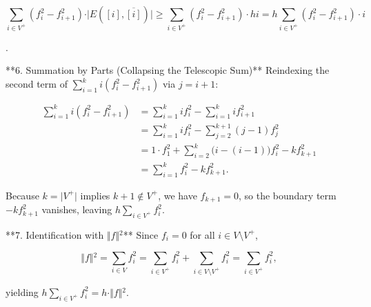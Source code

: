 \documentclass{article}
\begin{document}
$$\sum_{i \in V^+} (f_i^2 - f_{i+1}^2) \cdot \vert{}E([i], \overline{[i]})\vert{} \ge \sum_{i \in V^+} (f_i^2 - f_{i+1}^2) \cdot h i = h \sum_{i \in V^+} (f_i^2 - f_{i+1}^2) \cdot i$$

.

**6. Summation by Parts (Collapsing the Telescopic Sum)**
Reindexing the second term of $\sum_{i=1}^{k} i (f_i^2 - f_{i+1}^2)$ via $j = i + 1$:


$$\begin{aligned} \sum_{i=1}^{k} i (f_i^2 - f_{i+1}^2) &= \sum_{i=1}^{k} i f_i^2 - \sum_{i=1}^{k} i f_{i+1}^2 \\ &= \sum_{i=1}^{k} i f_i^2 - \sum_{j=2}^{k+1} (j - 1) f_j^2 \\ &= 1 \cdot f_1^2 + \sum_{i=2}^{k} \bigl(i - (i - 1)\bigr) f_i^2 - k f_{k+1}^2 \\ &= \sum_{i=1}^{k} f_i^2 - k f_{k+1}^2. \end{aligned}$$


Because $k = \vert{}V^+\vert{}$ implies $k + 1 \notin V^+$, we have $f_{k+1} = 0$, so the boundary term $-k f_{k+1}^2$ vanishes, leaving $h \sum_{i \in V^+} f_i^2$.

**7. Identification with $\Vert{}f\Vert{}^2$**
Since $f_i = 0$ for all $i \in V \setminus V^+$,


$$\Vert{}f\Vert{}^2 = \sum_{i \in V} f_i^2 = \sum_{i \in V^+} f_i^2 + \sum_{i \in V \setminus V^+} f_i^2 = \sum_{i \in V^+} f_i^2,$$


yielding $h \sum_{i \in V^+} f_i^2 = h \cdot \Vert{}f\Vert{}^2$.
\end{document}
